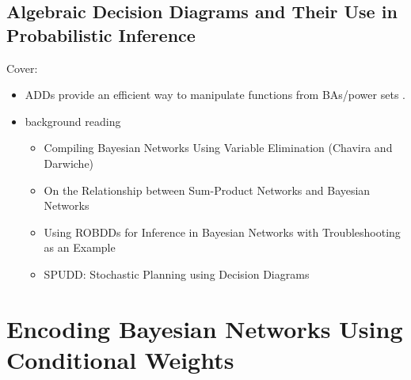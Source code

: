 \documentclass{article}
\theoremstyle{definition}
\theoremstyle{remark}
\begin{document}
\subsection{Algebraic Decision Diagrams and Their Use in Probabilistic
  Inference}

Cover:
\begin{itemize}
\item ADDs provide an efficient way to manipulate functions from BAs/power sets
  \cite{DBLP:journals/fmsd/BaharFGHMPS97}.
\item background reading
  \begin{itemize}
  \item Compiling Bayesian Networks Using Variable Elimination (Chavira and
    Darwiche) \cite{DBLP:conf/ijcai/ChaviraD07}
  \item On the Relationship between Sum-Product Networks and Bayesian Networks
    \cite{DBLP:conf/icml/ZhaoMP15}
  \item Using ROBDDs for Inference in Bayesian Networks with Troubleshooting as
    an Example \cite{DBLP:conf/uai/NielsenWJK00}
  \item SPUDD: Stochastic Planning using Decision Diagrams
    \cite{DBLP:conf/uai/HoeySHB99}
  \end{itemize}
\end{itemize}

\section{Encoding Bayesian Networks Using Conditional Weights}
\end{document}
